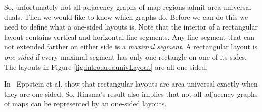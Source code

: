   So, unfortunately not all adjacency graphs of map regions admit area-universal duals.
  Then we would like to know which graphs do.
  Before we can do this we need to define what a one-sided layouts is.
  Note that the interior of a rectangular layout contains vertical and horizontal line segments.
  Any line segment that can not extended farther on either side is a \emph{maximal segment}.
  A rectangular layout is \emph{one-sided} if every maximal segment has only one rectangle on one of its sides.
  The layouts in Figure \ref{fig:intro:areaunivLayout} are all one-sided.

  In~\cite{Eppstein2012} Eppstein et al. show that rectangular layouts are area-universal exactly when they are one-sided.
  So, Rinsma's result also implies that not all adjacency graphs of maps can be represented by an one-sided layouts.


